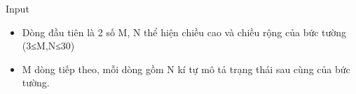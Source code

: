 Input
\begin{itemize}
	\item Dòng đầu tiên là 2 số M, N thể hiện chiều cao và chiều rộng của bức tường (3≤M,N≤30)
	\item M dòng tiếp theo, mỗi dòng gồm N kí tự mô tả trạng thái sau cùng của bức tường.
\end{itemize}